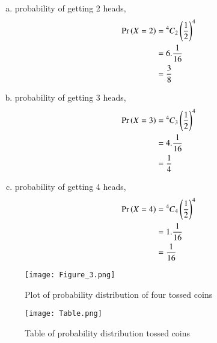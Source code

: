 \documentclass[journal,12pt,twocolumn]{IEEEtran}
\begin{document}
\begin{enumerate}[(i)]
\begin{enumerate}[(a)]
    \item probability of getting 2 heads,
        \begin{align}
            \begin{split}
                \Pr\left(X=2\right) &= {^4C_2}\left(\frac{1}{2}\right)^4\\
                &=6.\frac{1}{16}\\
                &=\frac{3}{8}
            \end{split}
        \end{align}

    \item probability of getting 3 heads,
        \begin{align}
            \begin{split}
                \Pr\left(X=3\right) &= {^4C_3}\left(\frac{1}{2}\right)^4\\
                &=4.\frac{1}{16}\\
                &=\frac{1}{4}
            \end{split}
        \end{align}

\item probability of getting 4 heads,
        \begin{align}
            \begin{split}
                \Pr\left(X=4\right) &= {^4C_4}\left(\frac{1}{2}\right)^4\\
                &=1.\frac{1}{16}\\
                &=\frac{1}{16}
            \end{split}
        \end{align}
\end{enumerate}

\begin{figure}[h!]
    \centering
    \texttt{[image: Figure\_3.png]}
    \caption{Plot of probability distribution of four tossed coins}
    \label{fig:Four coins}
\end{figure}
\end{enumerate}

\begin{figure}[h!]
    \centering
    \texttt{[image: Table.png]}
    \caption{Table of probability distribution tossed coins}
    \label{fig:Table}
\end{figure}
\end{document}
